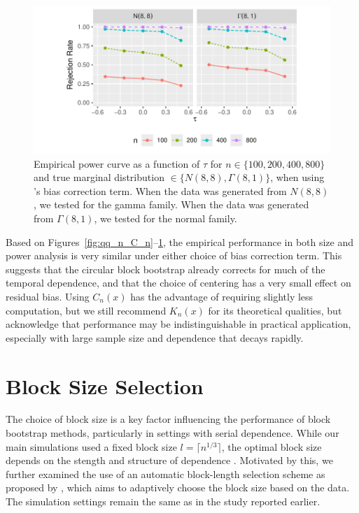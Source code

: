 \documentclass[12pt]{article}
\begin{document}
\begin{figure}[tbp]
  \centering
  \includegraphics[scale=1]{figures/rr_C_n}
  \caption{Empirical power curve as a function of $\tau$ for
    $n \in \{100, 200, 400, 800\}$ and true marginal distribution
    $\in \{N(8,8), \Gamma(8,1)\}$, when using \citet{babu2004goodness}'s bias correction term. When the data was generated from $N(8,8)$,
    we tested for the gamma family. When the data was generated from
    $\Gamma(8,1)$, we tested for the normal family.
  }
  \label{fig:rr_C_n}
\end{figure}

Based on Figures~\ref{fig:qq_n_C_n}--\ref{fig:rr_C_n}, 
the empirical performance in both size and power analysis is very similar under 
either choice of bias correction 
term. This suggests that the circular block bootstrap already corrects for
much of the temporal dependence, and that the choice of centering
has a very small effect on residual bias. Using $C_n(x)$ has the advantage
of requiring slightly less computation, but we 
still recommend $K_n(x)$ for its theoretical qualities, but acknowledge that
performance may be indistinguishable in practical application, especially
with large sample size and dependence that decays rapidly.


\section{Block Size Selection}

The choice of block size is a key factor influencing the performance
of block bootstrap methods, particularly in settings with serial
dependence. While our main simulations used a fixed block size
$l = \lceil n^{1/3} \rceil$, the optimal block size depends on the
stength and structure of dependence \citep{hall1995blocking,
  buhlmann1999block,  politis2004automatic}. Motivated by this, we
further examined the use of an automatic block-length selection scheme
as proposed by \citet{politis2004automatic}, which aims to adaptively
choose the block size based on the data. The simulation settings
remain the same as in the study reported earlier.
\end{document}
